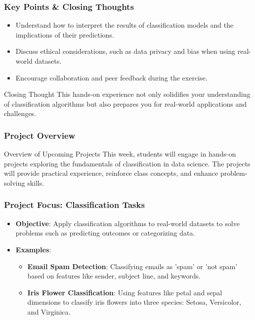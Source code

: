 \documentclass[aspectratio=169]{beamer}
\begin{document}
\begin{frame}
    \frametitle{Key Points & Closing Thoughts}
    \begin{itemize}
        \item Understand how to interpret the results of classification models and the implications of their predictions.
        \item Discuss ethical considerations, such as data privacy and bias when using real-world datasets.
        \item Encourage collaboration and peer feedback during the exercise.
    \end{itemize}

    \begin{block}{Closing Thought}
        This hands-on experience not only solidifies your understanding of classification algorithms but also prepares you for real-world applications and challenges.
    \end{block}
\end{frame}

\begin{frame}[fragile]
    \frametitle{Project Overview}
    \begin{block}{Overview of Upcoming Projects}
    This week, students will engage in hands-on projects exploring the fundamentals of classification in data science. 
    The projects will provide practical experience, reinforce class concepts, and enhance problem-solving skills.
    \end{block}
\end{frame}

\begin{frame}[fragile]
    \frametitle{Project Focus: Classification Tasks}
    \begin{itemize}
        \item \textbf{Objective}: Apply classification algorithms to real-world datasets to solve problems such as predicting outcomes or categorizing data.
        \item \textbf{Examples}:
        \begin{itemize}
            \item \textbf{Email Spam Detection}: Classifying emails as 'spam' or 'not spam' based on features like sender, subject line, and keywords.
            \item \textbf{Iris Flower Classification}: Using features like petal and sepal dimensions to classify iris flowers into three species: Setosa, Versicolor, and Virginica.
        \end{itemize}
    \end{itemize}
\end{frame}
\end{document}
